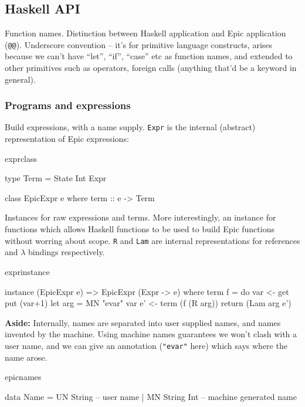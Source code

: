 \subsection{Haskell API}

Function names. Distinction between Haskell application and Epic
application (\texttt{@@}). Underscore convention -- it's for primitive
language constructs, arises because we can't have ``let'', ``if'',
``case'' etc as function names, and extended to other primitives such
as operators, foreign calls (anything that'd be a keyword in general).

\subsubsection*{Programs and expressions}

Build expressions, with a name supply. \texttt{Expr} is the internal
(abstract) representation of Epic expressions:

\begin{SaveVerbatim}{exprclass}

type Term = State Int Expr

class EpicExpr e where
    term :: e -> Term

\end{SaveVerbatim}

Instances for raw expressions and terms. More interestingly, an
instance for functions which allows Haskell functions to be used to
build Epic functions without worring about scope. \texttt{R} and
\texttt{Lam} are internal representations for references and $\lambda$
bindings respectively.

\begin{SaveVerbatim}{exprinstance}

instance (EpicExpr e) => EpicExpr (Expr -> e) where
    term f = do var <- get
                put (var+1)
                let arg = MN "evar" var
                e' <- term (f (R arg))
                return (Lam arg e')

\end{SaveVerbatim}

\noindent
\textbf{Aside:}
Internally, names are separated into user supplied names, and names
invented by the machine. Using machine names guarantees we won't clash
with a user name, and we can give an annotation (\texttt{"evar"} here)
which says where the name arose.

\begin{SaveVerbatim}{epicnames}

data Name = UN String     -- user name
          | MN String Int -- machine generated name

\end{SaveVerbatim}

